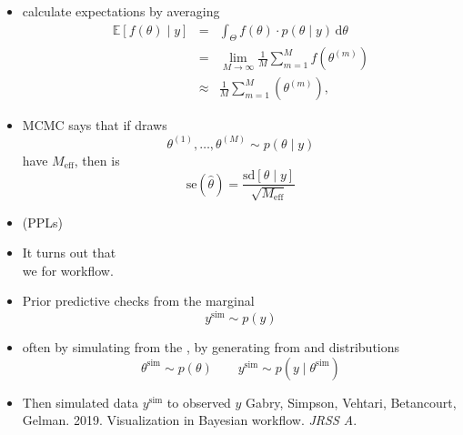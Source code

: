 \documentclass[10pt]{report}
\newcommand{\draw}[2]{#1^{(#2)}}
\newcommand{\displayfrac}[2]{{\displaystyle \frac{\displaystyle #1}{\displaystyle #2}}}
\newcommand{\simvar}[1]{#1^{\textrm{sim}}}
\begin{document}
\begin{itemize}
  \item calculate  expectations by averaging
\begin{eqnarray*}
  \mathbb{E}[f(\theta) \mid y]
  & = & \textstyle \int_{\Theta} f(\theta) \cdot p(\theta \mid y) \,
        \textrm{d}\theta
        \\[4pt]
  & = & \textstyle \lim_{M \rightarrow \infty} \frac{1}{M} \sum_{m = 1}^M
        f(\draw{\theta}{m})
        \\[4pt]
  & \approx & \textstyle \frac{1}{M} \sum_{m = 1}^M (\draw{\theta}{m}),
\end{eqnarray*}
\item MCMC  says that if draws
\[
  \draw{\theta}{1}, \ldots, \draw{\theta}{M} \sim p(\theta \mid y)
\]
have  $M_{\textrm{eff}}$, then
 is
\[
\textrm{se}(\hat{\theta})
  = \displayfrac{\textrm{sd}[\theta \mid y]}
                {\sqrt{M_{\textrm{eff}}}} 
\]
\end{itemize}

\begin{itemize}
\item {} (PPLs)
  \vfill
\item It turns out that
  \\
  we  for workflow.
\end{itemize}

\begin{itemize}
\item Prior predictive checks  from the marginal
  \[
    \simvar{y} \sim p(y)
  \]
\item often by simulating from the , by generating from  and  distributions
  \[
    \simvar{\theta} \sim p(\theta)
    \qquad
    \simvar{y} \sim p(y \mid \simvar{\theta})
  \]
\item Then  simulated data $\simvar{y}$ to observed $y$
  \vfill
  {\footnotesize Gabry, Simpson, Vehtari, Betancourt,
    Gelman. 2019. Visualization in Bayesian workflow. \textit{JRSS A}.}
\end{itemize}
\end{document}
